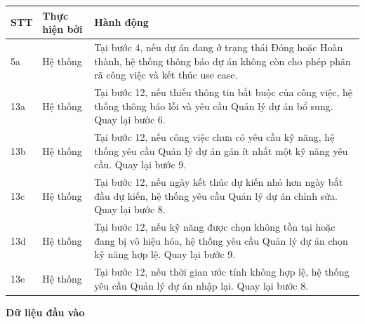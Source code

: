 \documentclass[../DoAn.tex]{subfiles}
\begin{document}
{\ucTableText
\begin{longtable}{|>{\centering\arraybackslash}p{}|p{}|p{}|}
\hline
\rowcolor{ucHeaderBg}\textbf{STT} & \textbf{Thực hiện bởi} & \textbf{Hành động} \\ \hline
5a & Hệ thống & Tại bước 4, nếu dự án đang ở trạng thái Đóng hoặc Hoàn thành, hệ thống thông báo dự án không còn cho phép phân rã công việc và kết thúc use case. \\ \hline
13a & Hệ thống & Tại bước 12, nếu thiếu thông tin bắt buộc của công việc, hệ thống thông báo lỗi và yêu cầu Quản lý dự án bổ sung. Quay lại bước 6. \\ \hline
13b & Hệ thống & Tại bước 12, nếu công việc chưa có yêu cầu kỹ năng, hệ thống yêu cầu Quản lý dự án gán ít nhất một kỹ năng yêu cầu. Quay lại bước 9. \\ \hline
13c & Hệ thống & Tại bước 12, nếu ngày kết thúc dự kiến nhỏ hơn ngày bắt đầu dự kiến, hệ thống yêu cầu Quản lý dự án chỉnh sửa. Quay lại bước 8. \\ \hline
13d & Hệ thống & Tại bước 12, nếu kỹ năng được chọn không tồn tại hoặc đang bị vô hiệu hóa, hệ thống yêu cầu Quản lý dự án chọn kỹ năng hợp lệ. Quay lại bước 9. \\ \hline
13e & Hệ thống & Tại bước 12, nếu thời gian ước tính không hợp lệ, hệ thống yêu cầu Quản lý dự án nhập lại. Quay lại bước 8. \\ \hline
\end{longtable}
}

\textbf{Dữ liệu đầu vào}
\end{document}
